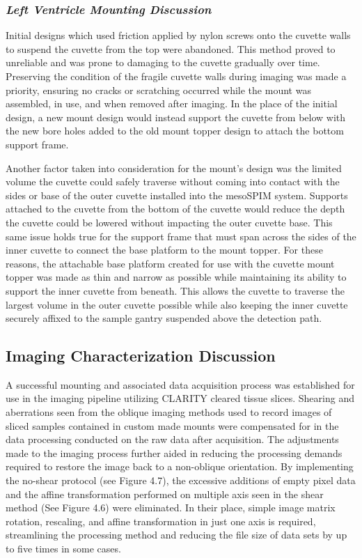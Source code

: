 \subsubsection{\textit{Left Ventricle Mounting Discussion}}

Initial designs which used friction applied by nylon screws onto the cuvette walls to suspend the cuvette from the top were abandoned. This method proved to unreliable and was prone to damaging to the cuvette gradually over time. Preserving the condition of the fragile cuvette walls during imaging was made a priority, ensuring no cracks or scratching occurred while the mount was assembled, in use, and when removed after imaging. In the place of the initial design, a new mount design would instead support the cuvette from below with the new bore holes added to the old mount topper design to attach the bottom support frame.

Another factor taken into consideration for the mount's design was the limited volume the cuvette could safely traverse without coming into contact with the sides or base of the outer cuvette installed into the mesoSPIM system. Supports attached to the cuvette from the bottom of the cuvette would reduce the depth the cuvette could be lowered without impacting the outer cuvette base. This same issue holds true for the support frame that must span across the sides of the inner cuvette to connect the base platform to the mount topper. For these reasons, the attachable base platform created for use with the cuvette mount topper was made as thin and narrow as possible while maintaining its ability to support the inner cuvette from beneath. This allows the cuvette to traverse the largest volume in the outer cuvette possible while also keeping the inner cuvette securely affixed to the sample gantry suspended above the detection path.



\subsection{Imaging Characterization Discussion}
A successful mounting and associated data acquisition process was established for use in the imaging pipeline utilizing CLARITY cleared tissue slices. Shearing and aberrations seen from the oblique imaging methods used to record images of sliced samples contained in custom made mounts were compensated for in the data processing conducted on the raw data after acquisition. The adjustments made to the imaging process further aided in reducing the processing demands required to restore the image back to a non-oblique orientation. By implementing the no-shear protocol (see Figure 4.7), the excessive additions of empty pixel data and the affine transformation performed on multiple axis seen in the shear method (See Figure 4.6) were eliminated. In their place, simple image matrix rotation, rescaling, and affine transformation in just one axis is required, streamlining the processing method and reducing the file size of data sets by up to five times in some cases. 

